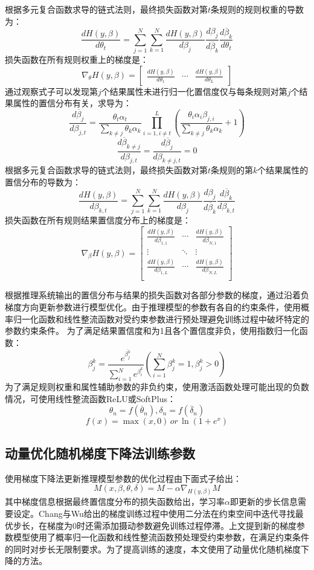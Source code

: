 \documentclass{cjc}
\begin{document}
根据多元复合函数求导的链式法则，最终损失函数对第$t$条规则的规则权重的导数为：
$$\frac{dH(y,\beta)}{d\theta_t}=\sum_{j=1}^N\sum_{k=1}^N\frac{dH(y,\beta)}{d\beta_j}\frac{d\beta_j}{d\overline{\beta}_k}\frac{d\overline{\beta}_k}{d\theta_t}$$
损失函数在所有规则权重上的梯度是：
$$
\nabla_{\theta}H(y,\beta)=\left[
\begin{matrix}
\frac{dH(y,\beta)}{d\theta_1} & \cdots &
\frac{dH(y,\beta)}{d\theta_L}
\end{matrix}
\right]
$$
通过观察式子可以发现第$j$个结果属性未进行归一化置信度仅与每条规则对第$j$个结果属性的置信分布有关，求导为：
$$\frac{d\overline{\beta}_j}{d\beta_{j,t}}=\frac{\theta_t\alpha_t}{\sum_{k\neq j}\theta_k\alpha_k}\prod_{i=1,i\neq t}^L(\frac{\theta_i\alpha_i\beta_{j,i}}{\sum_{k\neq j}\theta_k\alpha_k}+1)$$
$$\frac{d\overline{\beta}_{k\neq j}}{d\beta_{j,t}}=\frac{d\overline{\beta}_j}{d\beta_{k\neq j,t}}=0$$
根据多元复合函数求导的链式法则，最终损失函数对第$t$条规则的第$k$个结果属性的置信分布的导数为：
$$\frac{dH(y,\beta)}{d\beta_{k,t}}=\sum_{j=1}^N\sum_{k=1}^N\frac{dH(y,\beta)}{d\beta_j}\frac{d\beta_j}{d\overline{\beta}_k}\frac{d\overline{\beta}_k}{d\beta_{k,t}}$$
损失函数在所有规则结果置信度分布上的梯度是：
$$\nabla_{\beta}H(y,\beta)=
\left[
\begin{matrix}
\frac{dH(y,\beta)}{d\beta_{1,1}} & \cdots & 
\frac{dH(y,\beta)}{d\beta_{N,1}}\\
\vdots & \ddots & \vdots\\
\frac{dH(y,\beta)}{d\beta_{1,L}} & \cdots & 
\frac{dH(y,\beta)}{d\beta_{N,L}}\\
\end{matrix}
\right]$$

根据推理系统输出的置信分布与结果的损失函数对各部分参数的梯度，通过沿着负梯度方向更新参数进行模型优化。由于推理模型的参数有各自的约束条件，使用概率归一化函数和线性整流函数对受约束参数进行预处理避免训练过程中破坏特定的参数约束条件。  
为了满足结果置信度和为1且各个置信度非负，使用指数归一化函数：
$$\beta_j^k=\frac{e^{\overline{\beta_j^k}}}{\sum_{i=1}^Ne^{\overline{\beta_i^k}}}(\sum_{i=1}^N\beta_j^k=1,\beta_j^k>0)$$
为了满足规则权重和属性辅助参数的非负约束，使用激活函数处理可能出现的负数情况，可使用线性整流函数ReLU或SoftPlus：
$$\theta_n=f(\overline{\theta}_n),\delta_n=f(\overline{\delta}_n)$$
$$f(x)=\max(x,0)\,or\,\ln(1+e^x)$$
\subsection{动量优化随机梯度下降法训练参数}
使用梯度下降法更新推理模型参数的优化过程由下面式子给出：
$$M(x,\beta,\theta,\delta)=M-\alpha\nabla_{H(y,\beta)}M$$
其中梯度信息根据最终置信度分布的损失函数给出，学习率$\alpha$即更新的步长信息需要设定。Chang\cite{a10}与Wu\cite{a12}给出的梯度训练过程中使用二分法在约束空间中迭代寻找最优步长，在梯度为0时还需添加摄动参数避免训练过程停滞。上文提到新的梯度参数模型使用了概率归一化函数和线性整流函数预处理受约束参数，在满足约束条件的同时对步长无限制要求。为了提高训练的速度，本文使用了动量优化随机梯度下降的方法。
\end{document}
